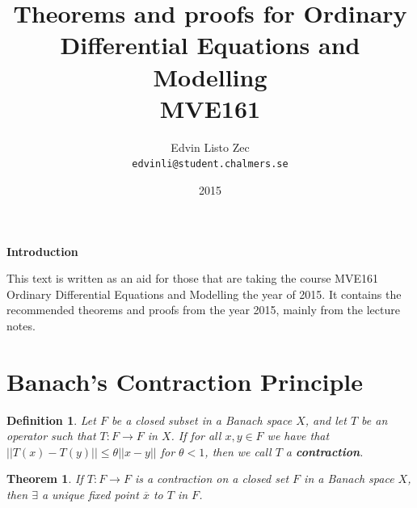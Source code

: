\documentclass[12pt, a4paper]{article}
\title{Theorems and proofs for Ordinary Differential Equations and Modelling \\ MVE161}
\author{Edvin Listo Zec \\ \texttt{edvinli@student.chalmers.se}}
\date{2015}
\newtheorem{theorem}{Theorem}[section]
\newtheorem{delfin}{Definition}[section]
\begin{document}
\maketitle
{}
\thispagestyle{empty}
\centerline{\textbf{Introduction}}
\noindent This text is written as an aid for those that are taking the course MVE161 Ordinary Differential Equations and Modelling the year of 2015. It contains the recommended theorems and proofs from the year 2015, mainly from the lecture notes.
\newline
 \newline
 
\newpage
\tableofcontents
\thispagestyle{empty}
\newpage
\setcounter{page}{1}


\section{Banach's Contraction Principle}
\begin{delfin}
Let $F$ be a closed subset in a Banach space $X$, and let $T$ be an operator such that $T : F \to F$ in $X$. If for all $x,y\in F$ we have that $||T(x)-T(y)|| \leq \theta ||x-y||$ for $\theta<1$, then we call $T$ a \textbf{contraction}. 
\end{delfin}
\begin{theorem}
If $T : F \to F$ is a contraction on a closed set $F$ in a Banach space $X$, then $\exists$ a unique fixed point $\overline{x}$ to $T$ in $F$.
\end{theorem}
\end{document}
